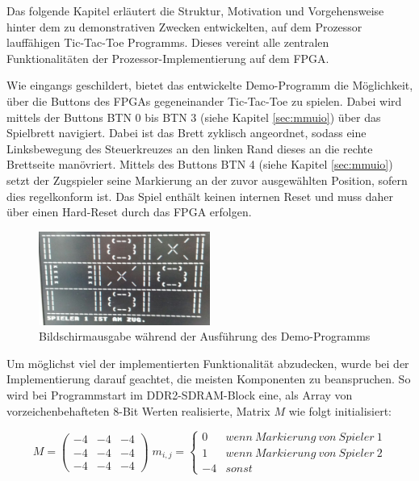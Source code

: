 
Das folgende Kapitel erl\"autert die Struktur, Motivation und Vorgehensweise hinter dem zu demonstrativen Zwecken entwickelten, auf dem Prozessor lauff\"ahigen Tic-Tac-Toe Programms. Dieses vereint alle zentralen Funktionalit\"aten der Prozessor-Implementierung auf dem FPGA.


Wie eingangs geschildert, bietet das entwickelte Demo-Programm die M\"oglichkeit, \"uber die Buttons des FPGAs gegeneinander Tic-Tac-Toe zu spielen. Dabei wird mittels der Buttons BTN 0 bis BTN 3 (siehe Kapitel \ref{sec:mmuio}) \"uber das Spielbrett navigiert. Dabei ist das Brett zyklisch angeordnet, sodass eine Linksbewegung des Steuerkreuzes an den linken Rand dieses an die rechte Brettseite man\"ovriert. Mittels des Buttons BTN 4 (siehe Kapitel \ref{sec:mmuio}) setzt der Zugspieler seine Markierung an der zuvor ausgew\"ahlten Position, sofern dies regelkonform ist. Das Spiel enth\"alt keinen internen Reset und muss daher \"uber einen Hard-Reset durch das FPGA erfolgen.

\begin{figure}[H]
	\centering
	\label{fig:gameplay}
		\includegraphics[width=0.5\textwidth]{gameplay.png}
	\caption{Bildschirmausgabe w\"ahrend der Ausf\"uhrung des Demo-Programms}
\end{figure}

Um m\"oglichst viel der implementierten Funktionalit\"at abzudecken, wurde bei der Implementierung darauf geachtet, die meisten Komponenten zu beanspruchen. So wird bei Programmstart im DDR2-SDRAM-Block eine, als Array von vorzeichenbehafteten 8-Bit Werten realisierte, Matrix $M$ wie folgt initialisiert:

\[ M = \begin{pmatrix} -4 & -4 & -4\\ -4 & -4 & -4\\ -4 & -4 & -4  \end{pmatrix}\;
 m_{i,j} = \begin{cases}
	0 & wenn\:Markierung\:von\:Spieler\:1 \\
	1 & wenn\:Markierung\:von\:Spieler\:2 \\
	-4 & sonst

\end{cases}\]

